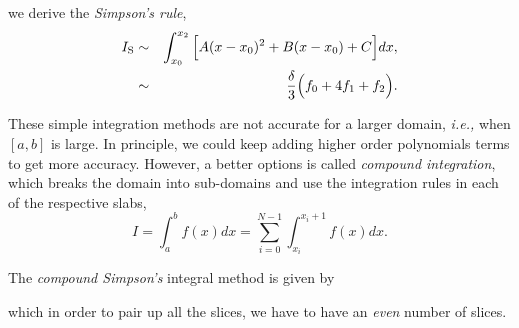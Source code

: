 \documentclass[11pt]{article}
\newcommand{\ie}{{\it i.e., }}
\begin{document}
we derive the {\it Simpson's rule}, 
\begin{eqnarray*}
I_{\rm S} &\sim& \int_{x_0}^{x_2} \Big [ A(x-x_0)^2 + B(x-x_0) + C  \Big ] dx,\\
&\sim& \frac{\delta}{3} \Big( f_0 + 4f_1 +f_2 \Big).
\end{eqnarray*}


\quad


These simple integration methods are not accurate for a larger domain, \ie when $[a,b]$ is large. In principle, we could keep adding higher order polynomials terms to get more accuracy. However, a better options is called {\it compound integration}, which breaks the domain into sub-domains and use the integration rules in each of the respective slabs,
$$I = \int_a^b f(x) dx = \sum_{i=0}^{N-1}  \int_{x_i}^{x_i+1} f(x) dx.$$

\quad

The {\it compound Simpson's} integral method is given by

\quad

\centerline{}

\quad

which in order to pair up all the slices, we have to have an {\it even} number of slices.

\quad
\end{document}
